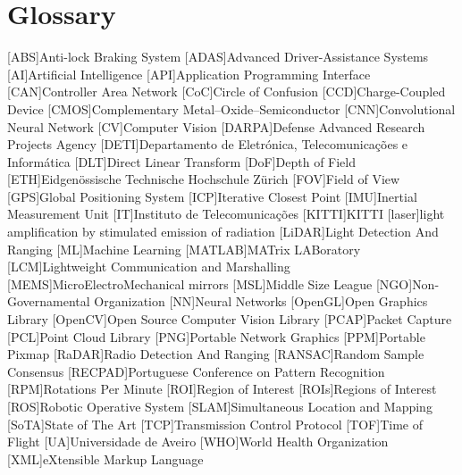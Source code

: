 \chapter{Glossary}

\footnotesize
\SingleSpacing

\begin{multicols}{2} 
\begin{acronym}[AAAAAA]
	[ABS]{Anti-lock Braking System}
	[ADAS]{Advanced Driver-Assistance Systems}
	[AI]{Artificial Intelligence}
	[API]{Application Programming Interface}
	[CAN]{Controller Area Network} 
	[CoC]{Circle of Confusion}
	[CCD]{Charge-Coupled Device}
	[CMOS]{Complementary Metal–Oxide–Semiconductor}
	[CNN]{Convolutional Neural Network}
	[CV]{Computer Vision}
	[DARPA]{Defense Advanced Research Projects Agency}
	[DETI]{Departamento de Eletrónica, Telecomunicações e Informática}
	[DLT]{Direct Linear Transform}
	[DoF]{Depth of Field}
	[ETH]{Eidgenössische Technische Hochschule Zürich}
	[FOV]{Field of View}
	[GPS]{Global Positioning System}
	[ICP]{Iterative Closest Point}
	[IMU]{Inertial Measurement Unit}
	[IT]{Instituto de Telecomunicações}
	[KITTI]{KITTI}
	[laser]{light amplification by stimulated emission of radiation}
	[LiDAR]{Light Detection And Ranging}
	[ML]{Machine Learning}
	[MATLAB\textsuperscript{\tiny\textregistered}]{MATrix LABoratory\textsuperscript{\tiny\textregistered}}
	[LCM]{Lightweight Communication and Marshalling}
	[MEMS]{MicroElectroMechanical mirrors}
	[MSL]{Middle Size League}
	[NGO]{Non-Governamental Organization} 
	[NN]{Neural Networks}
	[OpenGL]{Open Graphics Library}
	[OpenCV]{Open Source Computer Vision Library}
	[PCAP]{Packet Capture}
	[PCL]{Point Cloud Library}
	[PNG]{Portable Network Graphics}
	[PPM]{Portable Pixmap}
	[RaDAR]{Radio Detection And Ranging}
	[RANSAC]{Random Sample Consensus}
	[RECPAD]{Portuguese Conference on Pattern Recognition}
	[RPM]{Rotations Per Minute}
	[ROI]{Region of Interest}
	[ROIs]{Regions of Interest}
	[ROS]{Robotic Operative System} 
	[SLAM]{Simultaneous Location and Mapping} 
	[SoTA]{State of The Art}
	[TCP]{Transmission Control Protocol}
	[TOF]{Time of Flight} 
	[UA]{Universidade de Aveiro}
	[WHO]{World Health Organization}
	[XML]{eXtensible Markup Language}
\end{acronym}
\end{multicols}

